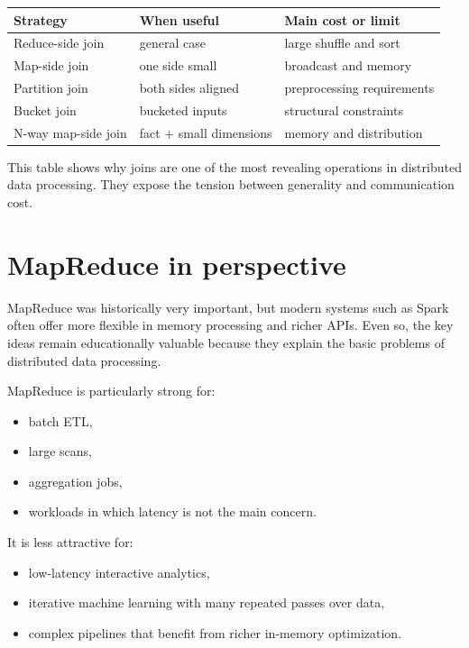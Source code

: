 \documentclass[11pt,a4paper,openany]{book}
\begin{document}
\begin{center}
\begin{tabular}{@{}p{3.2cm}p{5.3cm}p{4.0cm}@{}}
\toprule
\textbf{Strategy} & \textbf{When useful} & \textbf{Main cost or limit} \\
\midrule
Reduce-side join & general case & large shuffle and sort \\
Map-side join & one side small & broadcast and memory \\
Partition join & both sides aligned & preprocessing requirements \\
Bucket join & bucketed inputs & structural constraints \\
N-way map-side join & fact + small dimensions & memory and distribution \\
\bottomrule
\end{tabular}
\end{center}

This table shows why joins are one of the most revealing operations in distributed data processing. They expose the tension between generality and communication cost.

\section{MapReduce in perspective}
MapReduce was historically very important, but modern systems such as Spark often offer more flexible in memory processing and richer APIs. Even so, the key ideas remain educationally valuable because they explain the basic problems of distributed data processing.

MapReduce is particularly strong for:
\begin{itemize}
\item batch ETL,
\item large scans,
\item aggregation jobs,
\item workloads in which latency is not the main concern.
\end{itemize}

It is less attractive for:
\begin{itemize}
\item low-latency interactive analytics,
\item iterative machine learning with many repeated passes over data,
\item complex pipelines that benefit from richer in-memory optimization.
\end{itemize}
\end{document}
